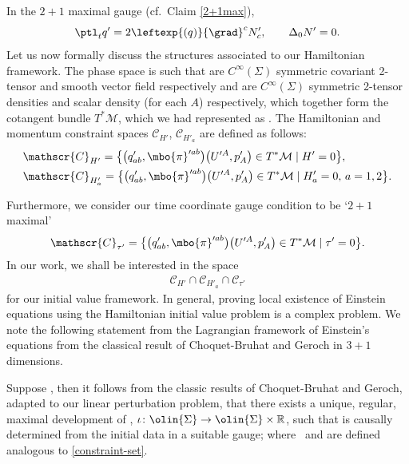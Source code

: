 In the $2+1$ maximal gauge (cf.\ Claim \ref{2+1max}),
\[
\ptl_t q' = 2\leftexp{(q)}{\grad}^c N'_c, \qquad \Delta_0 N' =0.
\]
Let us now formally discuss the structures associated to our Hamiltonian framework.
 The phase space  is such that  are $C^{\infty}(\Sigma)$ symmetric covariant 2-tensor and smooth vector field respectively and  are $C^{\infty}(\Sigma)$ symmetric 2-tensor densities and scalar density (for each $A$) respectively, which together form the cotangent bundle $T^*\mathcal{M}$, which we had represented as . The Hamiltonian and momentum constraint spaces $\mathscr{C}_{H'}$, $\mathscr{C}_{H'_a}$ are defined as follows:
 \begin{subequations} \label{constraint-set}
\begin{align}
&\mathscr{C}_{H'} = \bigl\{ \bigl(q'_{ab}, \mbo{\pi}'^{ab}\bigr)\bigl(U'^A, p'_A\bigr) \in T^*\mathcal{M} \mid H' =0 \bigr\}, \\
&\mathscr{C}_{H'_a} = \bigl\{ \bigl(q'_{ab}, \mbo{\pi}'^{ab}\bigr)\bigl(U'^A, p'_A\bigr) \in T^*\mathcal{M} \mid H'_a =0,\, a =1,2 \bigr\}.
\end{align}
\end{subequations}

Furthermore, we consider our time coordinate gauge condition to be `$2+1$ maximal'
\begin{align*}
\mathscr{C}_{\tau'} = \bigl\{ \bigl(q'_{ab}, \mbo{\pi}'^{ab}\bigr)\bigl(U'^A, p'_A\bigr) \in T^*\mathcal{M} \mid
\tau' =0 \bigr\}.
\end{align*}
In our work, we shall be interested in the space
\begin{align*}
\mathscr{C}_{H'} \cap \mathscr{C}_{H'_a} \cap \mathscr{C}_{\tau'}
\end{align*}
for our initial value framework.
In general, proving local existence of Einstein equations using the Hamiltonian initial value problem is a complex problem. %
We note the following statement from the Lagrangian framework of Einstein's equations from the classical result of Choquet-Bruhat and Geroch \cite{Bruhat_Geroch_classic} in $3+1$ dimensions.

Suppose , then it follows from the classic results of Choquet-Bruhat and Geroch, adapted to our linear perturbation problem, that there exists a unique, regular, maximal development of , $ \iota \colon \olin{\Sigma} \to \olin{\Sigma} \times \mathbb{R}$, such that  is causally determined from the initial data  in a suitable gauge; where~ and  are defined analogous to \eqref{constraint-set}.

